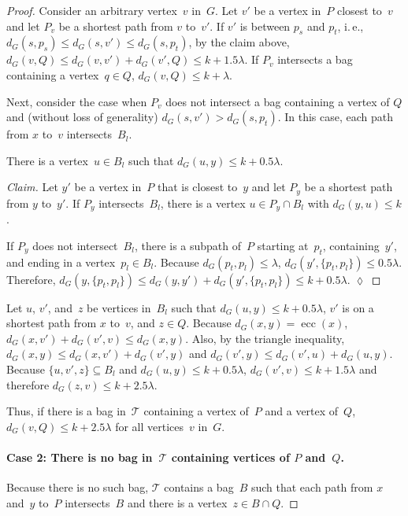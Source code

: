 \documentclass[10pt]{llncs}
\makeatletter
\newcommand{\calT}{\mathcal{T}}
\newcommand{\ie}{i.\,e.\@ifnextchar{,}{}{~}}
\DeclareMathOperator{\ecc}{ecc}
\DeclareRobustCommand{\qedClaim}
{\ifmmode \lozenge \else \leavevmode\unskip\penalty9999 \hbox{}\nobreak\hfill \quad\hbox{$\lozenge$}\fi }
\makeatother
\begin{document}
\begin{proof}
Consider an arbitrary vertex~$v$ in~$G$.
Let $v'$ be a vertex in~$P$ closest to~$v$ and let $P_v$ be a shortest path from $v$ to~$v'$.
If $v'$ is between $p_s$ and $p_t$, \ie, $d_G(s, p_s) \leq d_G(s, v') \leq d_G(s, p_t)$, by the claim above, $d_G(v, Q) \leq d_G(v, v') + d_G(v', Q) \leq k + 1.5 \lambda$.
If $P_v$ intersects a bag containing a vertex~$q \in Q$, $d_G(v, Q) \leq k + \lambda$.

Next, consider the case when $P_v$ does not intersect a bag containing a vertex of $Q$ and (without loss of generality) $d_G(s, v') > d_G(s, p_t)$.
In this case, each path from $x$ to~$v$ intersects~$B_l$.

\begin{claim}
There is a vertex~$u \in B_l$ such that $d_G(u, y) \leq k + 0.5 \lambda$.
\end{claim}

\begin{proof}
    [Claim]
Let $y'$ be a vertex in~$P$ that is closest to~$y$ and let $P_y$ be a shortest path from $y$ to~$y'$.
If $P_y$ intersects~$B_l$, there is a vertex $u \in P_y \cap B_l$ with $d_G(y, u) \leq k$.

If $P_y$ does not intersect~$B_l$, there is a subpath of~$P$ starting at~$p_t$, containing~$y'$, and ending in a vertex~$p_l \in B_l$.
Because $d_G(p_t, p_l) \leq \lambda$, $d_G(y', \{ p_t, p_l \}) \leq 0.5 \lambda$.
Therefore, $d_G(y, \{ p_t, p_l \}) \leq d_G(y, y') + d_G(y', \{ p_t, p_l \}) \leq k + 0.5 \lambda$.
\qedClaim
\end{proof}

Let $u$, $v'$, and~$z$ be vertices in~$B_l$ such that $d_G(u, y) \leq k + 0.5 \lambda$, $v'$ is on a shortest path from $x$ to~$v$, and $z \in Q$.
Because $d_G(x, y) = \ecc(x)$, $d_G(x, v') + d_G(v', v) \leq d_G(x, y)$.
Also, by the triangle inequality, $d_G(x, y) \leq d_G(x, v') + d_G(v', y)$ and $d_G(v', y) \leq d_G(v', u) + d_G(u, y)$.
Because $\{ u, v', z \} \subseteq B_l$ and $d_G(u, y) \leq k + 0.5 \lambda$, $d_G(v', v) \leq k + 1.5 \lambda$ and therefore $d_G(z, v) \leq k + 2.5 \lambda$.

Thus, if there is a bag in~$\calT$ containing a vertex of~$P$ and a vertex of~$Q$, $d_G(v, Q) \leq k + 2.5 \lambda$ for all vertices~$v$ in~$G$.

\paragraph{Case 2: There is no bag in~$\calT$ containing vertices of $P$ and~$Q$.}
Because there is no such bag, $\calT$ contains a bag~$B$ such that each path from $x$ and~$y$ to~$P$ intersects~$B$ and there is a vertex~$z \in B \cap Q$.


\end{proof}
\end{document}
